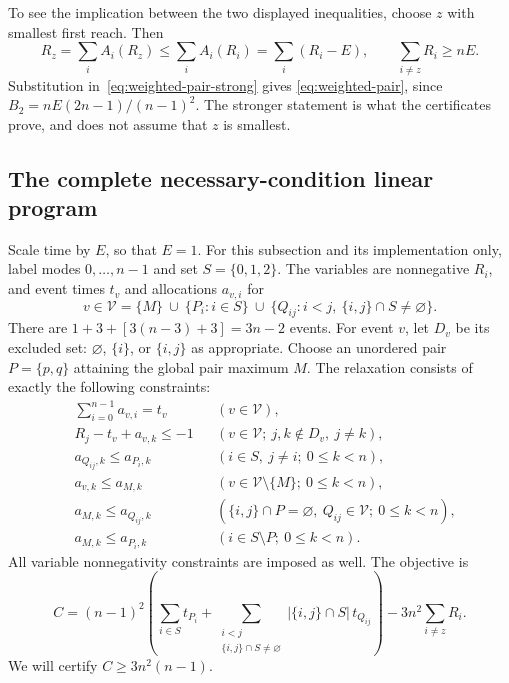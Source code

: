 To see the implication between the two displayed inequalities, choose $z$
with smallest first reach. Then
\[
 R_z=\sum_i A_i(R_z)\le\sum_i A_i(R_i)
     =\sum_i(R_i-E),
 \qquad \sum_{i\ne z}R_i\ge nE.
\]
Substitution in~\eqref{eq:weighted-pair-strong} gives
\eqref{eq:weighted-pair}, since
$B_2=nE(2n-1)/(n-1)^2$. The stronger statement is what the certificates
prove, and does not assume that $z$ is smallest.

\subsection{The complete necessary-condition linear program}\label{subsec:event-lp}

Scale time by $E$, so that $E=1$. For this subsection and its implementation
only, label modes $0,\ldots,n-1$ and set $S=\{0,1,2\}$. The variables are
nonnegative $R_i$, and event times $t_v$ and allocations $a_{v,i}$ for
\[
 v\in\mathcal V=
 \{M\}\ \cup\ \{P_i:i\in S\}\ \cup\
 \{Q_{ij}:i<j,\ \{i,j\}\cap S\ne\varnothing\}.
\]
There are $1+3+[3(n-3)+3]=3n-2$ events. For event $v$, let $D_v$ be
its excluded set: $\varnothing$, $\{i\}$, or $\{i,j\}$ as appropriate.
Choose an unordered pair $P=\{p,q\}$ attaining the global pair maximum
$M$. The relaxation consists of exactly the following constraints:
\begin{align}
 &\sum_{i=0}^{n-1}a_{v,i}=t_v &&(v\in\mathcal V),
       \label{eq:event-mass}\\
 &R_j-t_v+a_{v,k}\le-1
       &&(v\in\mathcal V;\ j,k\notin D_v,\ j\ne k),
       \label{eq:event-pair}\\
 &a_{Q_{ij},k}\le a_{P_i,k}
       &&(i\in S,\ j\ne i;\ 0\le k<n),
       \label{eq:event-inclusion}\\
 &a_{v,k}\le a_{M,k}
       &&(v\in\mathcal V\setminus\{M\};\ 0\le k<n),
       \label{eq:event-global}\\
 &a_{M,k}\le a_{Q_{ij},k}
       &&(\{i,j\}\cap P=\varnothing,\ Q_{ij}\in\mathcal V;\ 0\le k<n),
       \label{eq:event-equal-Q}\\
 &a_{M,k}\le a_{P_i,k}
       &&(i\in S\setminus P;\ 0\le k<n).
       \label{eq:event-equal-P}
\end{align}
All variable nonnegativity constraints are imposed as well. The objective is
\begin{equation}\label{eq:event-objective}
 C=(n-1)^2\left(\sum_{i\in S}t_{P_i}
   +\sum_{\substack{i<j\\\{i,j\}\cap S\ne\varnothing}}
          |\{i,j\}\cap S|\,t_{Q_{ij}}\right)
          -3n^2\sum_{i\ne z}R_i.
\end{equation}
We will certify $C\ge3n^2(n-1)$.

